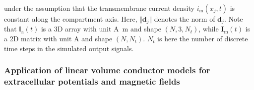 under the assumption that the transmembrane current density $i_\text{m}(x_j, t)$ is constant along the compartment axis.
Here, $\Vert\mathbf{d}_j \Vert$ denotes the norm of $\mathbf{d}_j$.
Note that $\mathbb{I}_\text{a}(t)$ is a 3D array with unit \si{\ampere \metre} and shape $(N, 3, N_t)$,
while $\mathbf{I}_\text{m}(t)$ is a 2D matrix with unit \si{A} and shape $(N, N_t)$.
$N_t$ is here the number of discrete time steps in the simulated output signals.



\subsubsection{Application of linear volume conductor models for extracellular potentials and magnetic fields}

